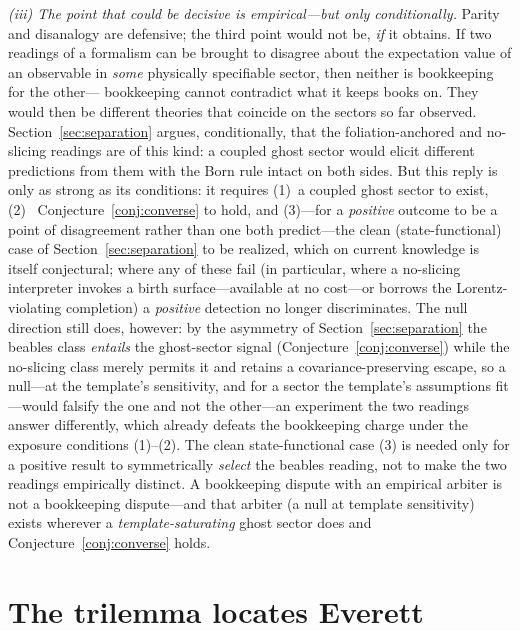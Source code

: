 \documentclass[11pt]{article}
\theoremstyle{remark}
\begin{document}
\emph{(iii) The point that could be decisive is empirical---but only
conditionally.} Parity and disanalogy
are defensive; the third point would not be, \emph{if} it obtains. If
two readings of a formalism can be brought to disagree about the
expectation value of an observable in \emph{some} physically
specifiable sector, then neither is bookkeeping for the other---%
bookkeeping cannot contradict what it keeps books on. They would then
be different theories that coincide on the sectors so far observed.
Section~\ref{sec:separation} argues, conditionally, that the
foliation-anchored and no-slicing readings are of this kind: a coupled
ghost sector would elicit different predictions from them with the Born
rule intact on both sides. But this reply is only as strong as its
conditions: it requires (1)~a coupled ghost sector to exist, (2)~%
Conjecture~\ref{conj:converse} to hold, and (3)---for a \emph{positive} outcome to
be a point of disagreement rather than one both predict---the clean
(state-functional) case of Section~\ref{sec:separation} to be realized,
which on current knowledge is itself conjectural; where any of these
fail (in particular, where a no-slicing interpreter invokes a birth
surface---available at no cost---or borrows the Lorentz-violating
completion) a \emph{positive}
detection no longer discriminates. The null direction still does,
however: by the asymmetry of Section~\ref{sec:separation} the beables
class \emph{entails} the ghost-sector signal (Conjecture~\ref{conj:converse})
while the no-slicing class merely permits it and retains a
covariance-preserving escape, so a null---at the template's sensitivity,
and for a sector the template's assumptions fit---would falsify the one
and not
the other---an experiment the two readings answer differently, which
already defeats the bookkeeping charge under the exposure conditions
(1)--(2). The clean state-functional case (3) is needed only for a
positive result to symmetrically \emph{select} the beables reading, not
to make the two readings empirically distinct. A bookkeeping dispute
with an empirical arbiter is not a bookkeeping dispute---and that
arbiter (a null at template sensitivity) exists wherever a
\emph{template-saturating} ghost sector does and
Conjecture~\ref{conj:converse} holds.

\section{The trilemma locates Everett}
\label{sec:trilemma}
\end{document}
